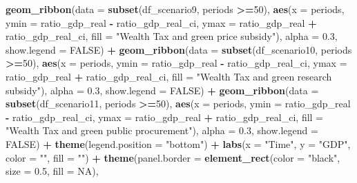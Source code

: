 \documentclass[
]{article}
\newenvironment{Shaded}{\begin{snugshade}}{\end{snugshade}}
\newcommand{\AttributeTok}[1]{\textcolor[rgb]{0.13,0.29,0.53}{#1}}
\newcommand{\ConstantTok}[1]{\textcolor[rgb]{0.56,0.35,0.01}{#1}}
\newcommand{\DecValTok}[1]{\textcolor[rgb]{0.00,0.00,0.81}{#1}}
\newcommand{\FloatTok}[1]{\textcolor[rgb]{0.00,0.00,0.81}{#1}}
\newcommand{\FunctionTok}[1]{\textcolor[rgb]{0.13,0.29,0.53}{\textbf{#1}}}
\newcommand{\NormalTok}[1]{#1}
\newcommand{\SpecialCharTok}[1]{\textcolor[rgb]{0.81,0.36,0.00}{\textbf{#1}}}
\newcommand{\StringTok}[1]{\textcolor[rgb]{0.31,0.60,0.02}{#1}}
\begin{document}
\begin{Shaded}
\begin{Highlighting}[]
  \FunctionTok{geom\_ribbon}\NormalTok{(}\AttributeTok{data =} \FunctionTok{subset}\NormalTok{(df\_scenario9, periods }\SpecialCharTok{\textgreater{}=}\DecValTok{50}\NormalTok{), }\FunctionTok{aes}\NormalTok{(}\AttributeTok{x =}\NormalTok{ periods, }\AttributeTok{ymin =}\NormalTok{ ratio\_gdp\_real }\SpecialCharTok{{-}}\NormalTok{ ratio\_gdp\_real\_ci, }\AttributeTok{ymax =}\NormalTok{ ratio\_gdp\_real }\SpecialCharTok{+}\NormalTok{ ratio\_gdp\_real\_ci, }\AttributeTok{fill =} \StringTok{"Wealth Tax and green price subsidy"}\NormalTok{), }\AttributeTok{alpha =} \FloatTok{0.3}\NormalTok{, }\AttributeTok{show.legend =} \ConstantTok{FALSE}\NormalTok{) }\SpecialCharTok{+}
  \FunctionTok{geom\_ribbon}\NormalTok{(}\AttributeTok{data =} \FunctionTok{subset}\NormalTok{(df\_scenario10, periods }\SpecialCharTok{\textgreater{}=}\DecValTok{50}\NormalTok{), }\FunctionTok{aes}\NormalTok{(}\AttributeTok{x =}\NormalTok{ periods, }\AttributeTok{ymin =}\NormalTok{ ratio\_gdp\_real }\SpecialCharTok{{-}}\NormalTok{ ratio\_gdp\_real\_ci, }\AttributeTok{ymax =}\NormalTok{ ratio\_gdp\_real }\SpecialCharTok{+}\NormalTok{ ratio\_gdp\_real\_ci, }\AttributeTok{fill =} \StringTok{"Wealth Tax and green research subsidy"}\NormalTok{), }\AttributeTok{alpha =} \FloatTok{0.3}\NormalTok{, }\AttributeTok{show.legend =} \ConstantTok{FALSE}\NormalTok{) }\SpecialCharTok{+}
  \FunctionTok{geom\_ribbon}\NormalTok{(}\AttributeTok{data =} \FunctionTok{subset}\NormalTok{(df\_scenario11, periods }\SpecialCharTok{\textgreater{}=}\DecValTok{50}\NormalTok{), }\FunctionTok{aes}\NormalTok{(}\AttributeTok{x =}\NormalTok{ periods, }\AttributeTok{ymin =}\NormalTok{ ratio\_gdp\_real }\SpecialCharTok{{-}}\NormalTok{ ratio\_gdp\_real\_ci, }\AttributeTok{ymax =}\NormalTok{ ratio\_gdp\_real }\SpecialCharTok{+}\NormalTok{ ratio\_gdp\_real\_ci, }\AttributeTok{fill =} \StringTok{"Wealth Tax and green public procurement"}\NormalTok{), }\AttributeTok{alpha =} \FloatTok{0.3}\NormalTok{, }\AttributeTok{show.legend =} \ConstantTok{FALSE}\NormalTok{) }\SpecialCharTok{+}
  \FunctionTok{theme}\NormalTok{(}\AttributeTok{legend.position =} \StringTok{"bottom"}\NormalTok{) }\SpecialCharTok{+}
  \FunctionTok{labs}\NormalTok{(}\AttributeTok{x =} \StringTok{"Time"}\NormalTok{, }\AttributeTok{y =} \StringTok{"GDP"}\NormalTok{, }\AttributeTok{color =} \StringTok{""}\NormalTok{, }\AttributeTok{fill =} \StringTok{""}\NormalTok{) }\SpecialCharTok{+}
  \FunctionTok{theme}\NormalTok{(}\AttributeTok{panel.border =} \FunctionTok{element\_rect}\NormalTok{(}\AttributeTok{color =} \StringTok{"black"}\NormalTok{, }\AttributeTok{size =} \FloatTok{0.5}\NormalTok{, }\AttributeTok{fill =} \ConstantTok{NA}\NormalTok{),}

\end{Highlighting}
\end{Shaded}
\end{document}
